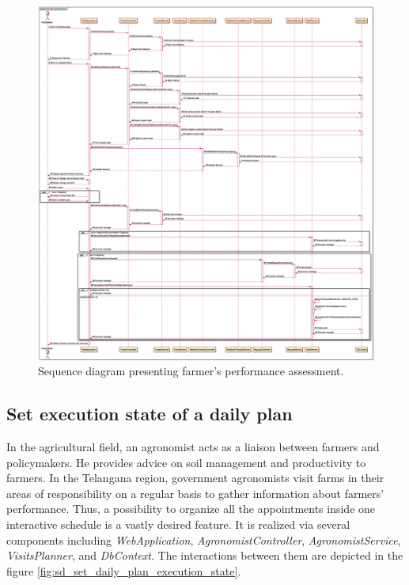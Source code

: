 \begin{figure}
    \centering
    \includegraphics[height=\textheight, width=\textwidth, keepaspectratio, origin=c]{diagrams/sequence/assess_farmers_performance}
    \caption{Sequence diagram presenting farmer's performance assessment.}
    \label{fig:sd_assess_farmers_performance}
\end{figure}

\subsection*{Set execution state of a daily plan}

In the agricultural field, an agronomist acts as a liaison between farmers and policymakers. He provides advice on soil management and productivity to farmers. In the Telangana region, government agronomists visit farms in their areas of responsibility on a regular basis to gather information about farmers' performance. Thus, a possibility to organize all the appointments inside one interactive schedule is a vastly desired feature. It is realized via several components including \textit{WebApplication}, \textit{AgronomistController}, \textit{AgronomistService}, \textit{VisitsPlanner}, and \textit{DbContext}. The interactions between them are depicted in the figure \ref{fig:sd_set_daily_plan_execution_state}.

